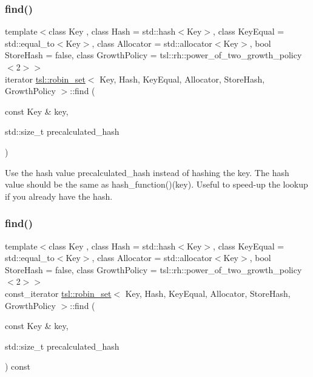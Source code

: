 \subsubsection{\texorpdfstring{find()}{find()}\hspace{0.1cm}{\footnotesize\ttfamily [1/6]}}
{\footnotesize\ttfamily template$<$class Key , class Hash  = std\+::hash$<$\+Key$>$, class Key\+Equal  = std\+::equal\+\_\+to$<$\+Key$>$, class Allocator  = std\+::allocator$<$\+Key$>$, bool Store\+Hash = false, class Growth\+Policy  = tsl\+::rh\+::power\+\_\+of\+\_\+two\+\_\+growth\+\_\+policy$<$2$>$$>$ \\
iterator \mbox{\hyperlink{classtsl_1_1robin__set}{tsl\+::robin\+\_\+set}}$<$ Key, Hash, Key\+Equal, Allocator, Store\+Hash, Growth\+Policy $>$\+::find (\begin{DoxyParamCaption}\item[{const Key \&}]{key,  }\item[{std\+::size\+\_\+t}]{precalculated\+\_\+hash }\end{DoxyParamCaption})\hspace{0.3cm}{\ttfamily [inline]}}

Use the hash value \textquotesingle{}precalculated\+\_\+hash\textquotesingle{} instead of hashing the key. The hash value should be the same as hash\+\_\+function()(key). Useful to speed-\/up the lookup if you already have the hash. \mbox{\label{classtsl_1_1robin__set_a76283e2c9497ee7d4e5eddfdb23d23bb}} 
\subsubsection{\texorpdfstring{find()}{find()}\hspace{0.1cm}{\footnotesize\ttfamily [2/6]}}
{\footnotesize\ttfamily template$<$class Key , class Hash  = std\+::hash$<$\+Key$>$, class Key\+Equal  = std\+::equal\+\_\+to$<$\+Key$>$, class Allocator  = std\+::allocator$<$\+Key$>$, bool Store\+Hash = false, class Growth\+Policy  = tsl\+::rh\+::power\+\_\+of\+\_\+two\+\_\+growth\+\_\+policy$<$2$>$$>$ \\
const\+\_\+iterator \mbox{\hyperlink{classtsl_1_1robin__set}{tsl\+::robin\+\_\+set}}$<$ Key, Hash, Key\+Equal, Allocator, Store\+Hash, Growth\+Policy $>$\+::find (\begin{DoxyParamCaption}\item[{const Key \&}]{key,  }\item[{std\+::size\+\_\+t}]{precalculated\+\_\+hash }\end{DoxyParamCaption}) const\hspace{0.3cm}{\ttfamily [inline]}}





